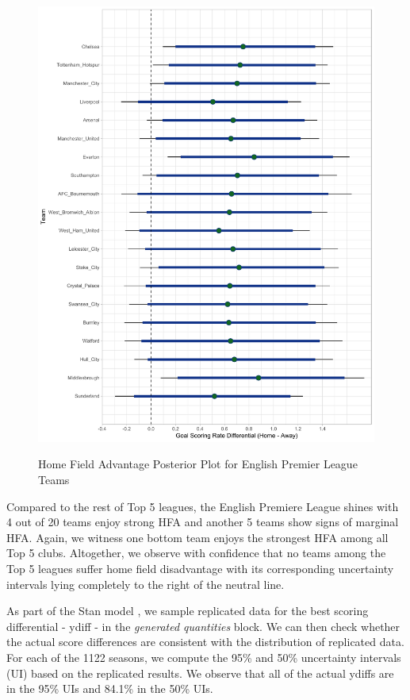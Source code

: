 \documentclass[USenglish]{article}
\begin{document}
\begin{figure}
\caption{Home Field Advantage Posterior Plot for English Premier League Teams}
{\includegraphics[width=0.90\linewidth]{HFA_EPL11.pdf}}
\label{fig7}
\end{figure}

Compared to the rest of Top 5 leagues, the English Premiere League shines with 4 out of 20 teams enjoy strong HFA and another 5 teams show signs of marginal HFA. Again, we witness one bottom team enjoys the strongest HFA among all Top 5 clubs. Altogether, we observe with confidence that no teams among the Top 5 leagues suffer home field disadvantage with its corresponding uncertainty intervals lying completely to the right of the neutral line.

As part of the Stan model \citep{team2015stan}, we sample replicated data for the best scoring differential - ydiff - in the \textit{generated quantities} block. We can then check whether the actual score differences are consistent with the distribution of replicated data. For each of the 1122 seasons, we compute the 95\% and 50\% uncertainty intervals (UI) based on the replicated results. We observe that all of the actual ydiffs are in the 95\% UIs and 84.1\% in the 50\% UIs.   
\end{document}
